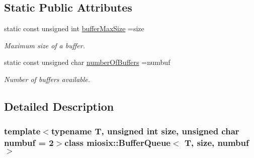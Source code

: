 \subsection*{Static Public Attributes}
\begin{DoxyCompactItemize}
\item 
\hypertarget{classmiosix_1_1_buffer_queue_a58aceb714cca14390a70d16c209d0734}{static const unsigned int \hyperlink{classmiosix_1_1_buffer_queue_a58aceb714cca14390a70d16c209d0734}{buffer\-Max\-Size} =size}\label{classmiosix_1_1_buffer_queue_a58aceb714cca14390a70d16c209d0734}

\begin{DoxyCompactList}\small\item\em Maximum size of a buffer. \end{DoxyCompactList}\item 
\hypertarget{classmiosix_1_1_buffer_queue_a12df0bf851baa1179dfc220270a8300a}{static const unsigned char \hyperlink{classmiosix_1_1_buffer_queue_a12df0bf851baa1179dfc220270a8300a}{number\-Of\-Buffers} =numbuf}\label{classmiosix_1_1_buffer_queue_a12df0bf851baa1179dfc220270a8300a}

\begin{DoxyCompactList}\small\item\em Number of buffers available. \end{DoxyCompactList}\end{DoxyCompactItemize}


\subsection{Detailed Description}
\subsubsection*{template$<$typename T, unsigned int size, unsigned char numbuf = 2$>$class miosix\-::\-Buffer\-Queue$<$ T, size, numbuf $>$}


